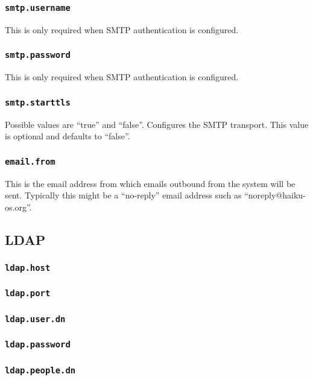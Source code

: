 \subsubsection{\tt smtp.username}

This is only required when SMTP authentication is configured.

\subsubsection{\tt smtp.password}

This is only required when SMTP authentication is configured.

\subsubsection{\tt smtp.starttls}

Possible values are ``true'' and ``false''.  Configures the SMTP transport.  This value is optional and defaults to ``false''.

\subsubsection{\tt email.from}

This is the email address from which emails outbound from the system will be sent.  Typically this might be a ``no-reply'' email address such as ``noreply@haiku-os.org''.

\subsection{LDAP}


\subsubsection{\tt ldap.host}
\subsubsection{\tt ldap.port}
\subsubsection{\tt ldap.user.dn}
\subsubsection{\tt ldap.password}
\subsubsection{\tt ldap.people.dn}